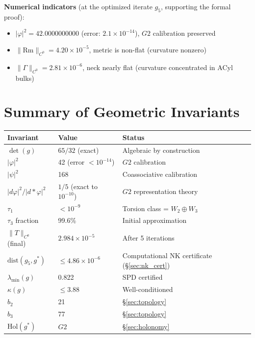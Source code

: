 \documentclass[11pt,a4paper]{article}
\newcommand{\Gtwo}{\mathrm{G}_2}
\newcommand{\Hol}{\mathrm{Hol}}
\newcommand{\dist}{\mathrm{dist}}
\newcommand{\norm}[1]{\|#1\|}
\theoremstyle{remark}
\def\Gtwo{G2}%
\begin{document}
\textbf{Numerical indicators} (at the optimized iterate $g_5$, supporting the formal proof):
\begin{itemize}
    \item $|\varphi|^2 = 42.0000000000$ (error: $2.1 \times 10^{-14}$), $\Gtwo$ calibration preserved
    \item $\norm{\mathrm{Rm}}_{C^0} = 4.20 \times 10^{-5}$, metric is non-flat (curvature nonzero)
    \item $\norm{\Gamma}_{C^0} = 2.81 \times 10^{-6}$, neck nearly flat (curvature concentrated in ACyl bulks)
\end{itemize}

\section{Summary of Geometric Invariants}\label{sec:invariants}

\begin{table}[H]
\centering
\begin{tabular}{lll}
\toprule
\textbf{Invariant} & \textbf{Value} & \textbf{Status} \\
\midrule
$\det(g)$ & $65/32$ (exact) & Algebraic by construction \\
$|\varphi|^2$ & 42 (error $< 10^{-14}$) & $\Gtwo$ calibration \\
$|\psi|^2$ & 168 & Coassociative calibration \\
$|d\varphi|^2/|d{*}\varphi|^2$ & $1/5$ (exact to $10^{-10}$) & $\Gtwo$ representation theory~\cite{fernandez1982} \\
$\tau_1$ & $< 10^{-9}$ & Torsion class = $W_2 \oplus W_3$ \\
$\tau_3$ fraction & 99.6\% & Initial approximation \\
$\norm{T}_{C^0}$ (final) & $2.984 \times 10^{-5}$ & After 5 iterations \\
$\dist(g_5, g^*)$ & $\leq 4.86 \times 10^{-6}$ & Computational NK certificate (\S\ref{sec:nk_cert}) \\
$\lambda_{\min}(g)$ & 0.822 & SPD certified \\
$\kappa(g)$ & $\leq 3.88$ & Well-conditioned \\
$b_2$ & 21 & \S\ref{sec:topology} \\
$b_3$ & 77 & \S\ref{sec:topology} \\
$\Hol(g^*)$ & $\Gtwo$ & \S\ref{sec:holonomy} \\
\bottomrule
\end{tabular}
\end{table}
\end{document}
